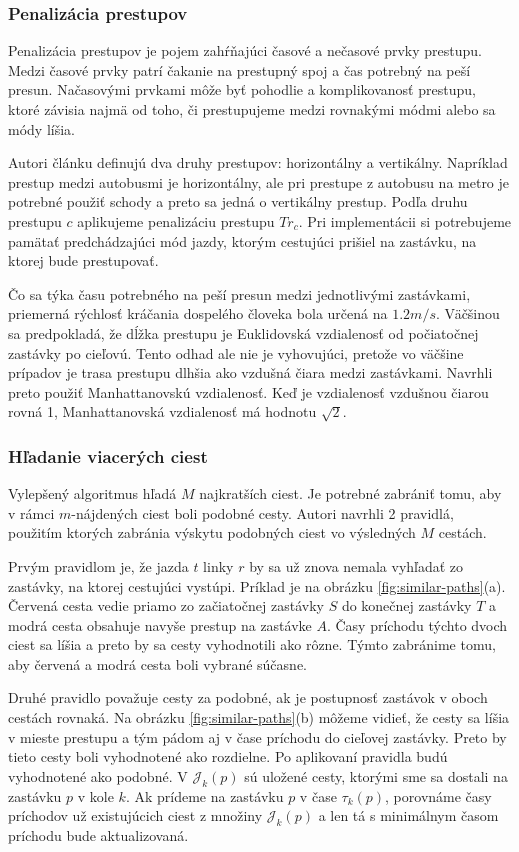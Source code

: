 \subsubsection{Penalizácia prestupov}
Penalizácia prestupov je pojem zahŕňajúci časové a nečasové prvky prestupu. Medzi časové prvky patrí čakanie na prestupný spoj a čas potrebný na peší presun. Načasovými prvkami môže byť pohodlie a komplikovanosť prestupu, ktoré závisia najmä od toho, či prestupujeme medzi rovnakými módmi alebo sa módy líšia. 

Autori článku definujú dva druhy prestupov: horizontálny a vertikálny. Napríklad prestup medzi autobusmi je horizontálny, ale pri prestupe z autobusu na metro je potrebné použiť schody a preto sa jedná o vertikálny prestup. Podľa druhu prestupu $c$ aplikujeme penalizáciu prestupu $Tr_c$. Pri implementácii si potrebujeme pamätať predchádzajúci mód jazdy, ktorým cestujúci prišiel na zastávku, na ktorej bude prestupovať.

Čo sa týka času potrebného na peší presun medzi jednotlivými zastávkami, priemerná rýchlosť kráčania dospelého človeka bola určená na $1.2 m/s$. Väčšinou sa predpokladá, že dĺžka prestupu je Euklidovská vzdialenosť od počiatočnej zastávky po cieľovú. Tento odhad ale nie je vyhovujúci, pretože vo väčšine prípadov je trasa prestupu dlhšia ako vzdušná čiara medzi zastávkami. Navrhli preto použiť Manhattanovskú vzdialenosť. Keď je vzdialenosť vzdušnou čiarou rovná 1, Manhattanovská vzdialenosť má hodnotu $\sqrt{2}$.

\subsubsection{Hľadanie viacerých ciest}
Vylepšený algoritmus hľadá $M$ najkratších ciest. Je potrebné zabrániť tomu, aby v rámci $m$-nájdených ciest boli podobné cesty. Autori navrhli 2 pravidlá, použitím ktorých zabránia výskytu podobných ciest vo výsledných $M$ cestách.

Prvým pravidlom je, že jazda $t$ linky $r$ by sa už znova nemala vyhľadať zo zastávky, na ktorej cestujúci vystúpi. Príklad je na obrázku \ref{fig:similar-paths}(a). Červená cesta vedie priamo zo začiatočnej zastávky $S$ do konečnej zastávky $T$ a modrá cesta obsahuje navyše prestup na zastávke $A$. Časy príchodu týchto dvoch ciest sa líšia a preto by sa cesty vyhodnotili ako rôzne. Týmto zabránime tomu, aby červená a modrá cesta boli vybrané súčasne.

Druhé pravidlo považuje cesty za podobné, ak je postupnosť zastávok v oboch cestách rovnaká. Na obrázku \ref{fig:similar-paths}(b) môžeme vidieť, že cesty sa líšia v mieste prestupu a tým pádom aj v čase príchodu do cieľovej zastávky. Preto by tieto cesty boli vyhodnotené ako rozdielne. Po aplikovaní pravidla budú vyhodnotené ako podobné. 
V $\mathcal{J}_k(p)$ sú uložené cesty, ktorými sme sa dostali na zastávku $p$ v kole $k$. Ak prídeme na zastávku $p$ v čase $\tau_k(p)$, porovnáme časy príchodov už existujúcich ciest z množiny $\mathcal{J}_k(p)$ a len tá s minimálnym časom príchodu bude aktualizovaná.

